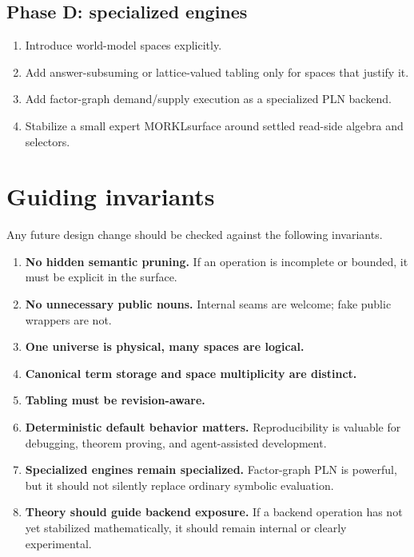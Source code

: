 \documentclass[11pt]{article}
\newcommand{\MORKL}{\textsc{MORKL}}
\begin{document}
\subsection*{Phase D: specialized engines}
\begin{enumerate}
    \item Introduce world-model spaces explicitly.
    \item Add answer-subsuming or lattice-valued tabling only for spaces that justify it.
    \item Add factor-graph demand/supply execution as a specialized PLN backend.
    \item Stabilize a small expert \MORKL surface around settled read-side algebra and selectors.
\end{enumerate}

\section{Guiding invariants}
Any future design change should be checked against the following invariants.

\begin{enumerate}
    \item \textbf{No hidden semantic pruning.} If an operation is incomplete or bounded, it must be explicit in the surface.
    \item \textbf{No unnecessary public nouns.} Internal seams are welcome; fake public wrappers are not.
    \item \textbf{One universe is physical, many spaces are logical.}
    \item \textbf{Canonical term storage and space multiplicity are distinct.}
    \item \textbf{Tabling must be revision-aware.}
    \item \textbf{Deterministic default behavior matters.} Reproducibility is valuable for debugging, theorem proving, and agent-assisted development.
    \item \textbf{Specialized engines remain specialized.} Factor-graph PLN is powerful, but it should not silently replace ordinary symbolic evaluation.
    \item \textbf{Theory should guide backend exposure.} If a backend operation has not yet stabilized mathematically, it should remain internal or clearly experimental.
\end{enumerate}
\end{document}
